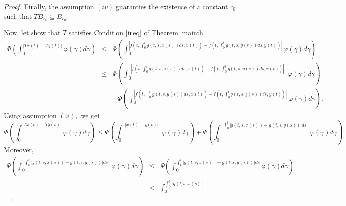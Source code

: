 \documentclass{amsart}
\theoremstyle{plain}
\numberwithin{equation}{section}
\begin{document}
\begin{proof}
Finally, the assumption $\left( iv\right) $ guaranties the existence of a
constant $r_{0}$ such that $TB_{r_{0}}\subseteq B_{r_{0}}.$

Now, let show that $T$ satisfies Condition \ref{ineq} of Theorem \ref{mainth}.\begin{eqnarray*}
\Phi \left( \int_{0}^{\left\vert Tx\left( t\right) -Ty\left( t\right)
\right\vert }\varphi \left( \gamma \right) d\gamma \right) &\leqslant &\Phi
\left( \int_{0}^{\left\vert f\left( t,\int_{0}^{t}g\left( t,s,x\left(
s\right) \right) ds,x\left( t\right) \right) -f\left( t,\int_{0}^{t}g\left(
t,s,y\left( s\right) \right) ds,y\left( t\right) \right) \right\vert
}\varphi \left( \gamma \right) d\gamma \right) \\
&\leqslant &\Phi \left( \int_{0}^{\substack{ \left\vert f\left(
t,\int_{0}^{t}g\left( t,s,x\left( s\right) \right) ds,x\left( t\right)
\right) -f\left( t,\int_{0}^{t}g\left( t,s,y\left( s\right) \right)
ds,x\left( t\right) \right) \right\vert }}\varphi \left( \gamma \right)
d\gamma \right) \\
&&+\Phi \left( \int_{0}^{\left\vert f\left( t,\int_{0}^{t}g\left(
t,s,y\left( s\right) \right) ds,x\left( t\right) \right) -f\left(
t,\int_{0}^{t}g\left( t,s,y\left( s\right) \right) ds,y\left( t\right)
\right) \right\vert }\varphi \left( \gamma \right) d\gamma \right) .
\end{eqnarray*}Using assumption $\left( ii\right) ,$ we get\begin{equation}
\Phi \left( \int_{0}^{\left\vert Tx\left( t\right) -Ty\left( t\right)
\right\vert }\varphi \left( \gamma \right) d\gamma \right) \leqslant \Psi
\left( \int_{0}^{\substack{ \left\vert x\left( t\right) -y\left( t\right)
\right\vert }}\varphi \left( \gamma \right) d\gamma \right) +\Psi \left(
\int_{0}^{\substack{ \int_{0}^{t}\left\vert g\left( t,s,x\left( s\right)
\right) -g\left( t,s,y\left( s\right) \right) \right\vert ds}}\varphi \left(
\gamma \right) d\gamma \right)  \label{condit}
\end{equation}Moreover,\begin{eqnarray*}
\Psi \left( \int_{0}^{\substack{ \int_{0}^{t}\left\vert g\left( t,s,x\left(
s\right) \right) -g\left( t,s,y\left( s\right) \right) \right\vert ds}}\varphi \left( \gamma \right) d\gamma \right) &\leqslant &\Psi \left(
\int_{0}^{\int_{0}^{t}\left\vert g\left( t,s,x\left( s\right) \right)
-g\left( t,s,y\left( s\right) \right) \right\vert ds}\varphi \left( \gamma
\right) d\gamma \right) \\
&<&\int_{0}^{\int_{0}^{t}\left\vert g\left( t,s,x\left( s\right) \right)
}
\end{eqnarray*}
\end{proof}
\end{document}
